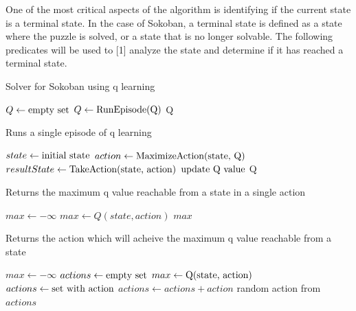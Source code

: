 \documentclass[times, 10pt,twocolumn]{article}
\begin{document}
One of the most critical aspects of the algorithm is identifying if the current state is a terminal state. In the case of Sokoban, a terminal state is defined as a state where the puzzle is solved, or a state that is no longer solvable. The following predicates will be used to [1] analyze the state and determine if it has reached a terminal state.

\begin{algorithm}
  \caption{Solver for Sokoban using q learning}
  \begin{algorithmic}[2]
      \State $Q\gets \textnormal{empty set}$
        \State $Q\gets \textnormal{RunEpisode(Q)}$
      \EndFor
      \Return Q
    \EndFunction
  \end{algorithmic}
\end{algorithm}

\begin{algorithm}
  \caption{Runs a single episode of q learning}
  \begin{algorithmic}[3]
      \State $state\gets \textnormal{initial state}$
        \State $action\gets \textnormal{MaximizeAction(state, Q)}$
        \State $resultState\gets \textnormal{TakeAction(state, action)}$
        \State $\textnormal{update Q value}$
      \EndWhile
      \State \Return Q
    \EndFunction
  \end{algorithmic}
\end{algorithm}

\begin{algorithm}
  \caption{Returns the maximum q value reachable from a state in a single action}
  \begin{algorithmic}[4]
      \State $max\gets -\infty$
          \State $max\gets Q(state, action)$
        \EndIf
      \EndFor
      \State \Return $max$
    \EndFunction
  \end{algorithmic}
\end{algorithm}

\begin{algorithm}
  \caption{Returns the action which will acheive the maximum q value reachable from a state}
  \begin{algorithmic}[5]
      \State $max\gets -\infty$
      \State $actions\gets \textnormal{empty set}$
          \State $max\gets \textnormal{Q(state, action)}$
          \State $actions\gets \textnormal{set with action}$
        \Else
          \State $actions\gets actions + action$
        \EndIf
      \EndFor
      \State \Return random action from $actions$
    \EndFunction
  \end{algorithmic}
\end{algorithm}
\end{document}
